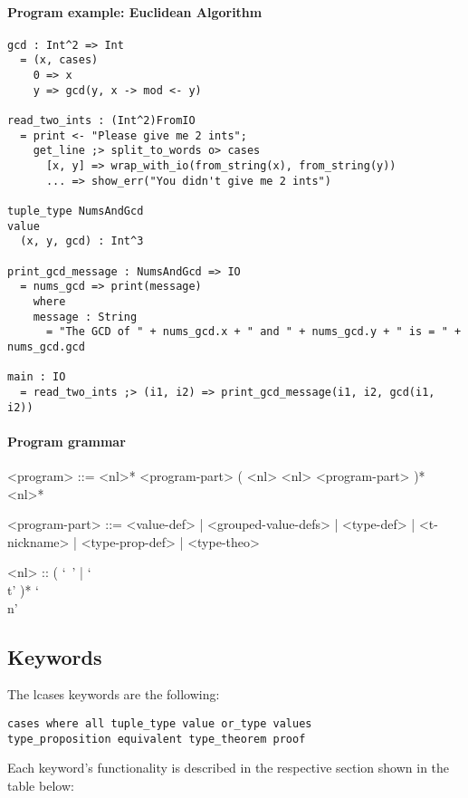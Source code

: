 \documentclass{article}
\begin{document}
\paragraph{Program example: Euclidean Algorithm}
\begin{verbatim}
gcd : Int^2 => Int
  = (x, cases)
    0 => x
    y => gcd(y, x -> mod <- y) 

read_two_ints : (Int^2)FromIO
  = print <- "Please give me 2 ints";
    get_line ;> split_to_words o> cases
      [x, y] => wrap_with_io(from_string(x), from_string(y))
      ... => show_err("You didn't give me 2 ints")

tuple_type NumsAndGcd
value
  (x, y, gcd) : Int^3

print_gcd_message : NumsAndGcd => IO
  = nums_gcd => print(message)
    where
    message : String
      = "The GCD of " + nums_gcd.x + " and " + nums_gcd.y + " is = " + nums_gcd.gcd

main : IO
  = read_two_ints ;> (i1, i2) => print_gcd_message(i1, i2, gcd(i1, i2))
\end{verbatim}

\paragraph{Program grammar}
\begin{grammar}
<program> ::=
<nl>* <program-part> ( <nl> <nl> <program-part> )* <nl>*

<program-part> ::=
<value-def> | <grouped-value-defs> | <type-def> | <t-nickname> | <type-prop-def> |
<type-theo>

<nl> :: ( `\ ' | `\\t' )* `\\n'
\end{grammar}

\subsection{Keywords}

The lcases keywords are the following:
\begin{verbatim}
cases where all tuple_type value or_type values
type_proposition equivalent type_theorem proof
\end{verbatim}
Each keyword's functionality is described in the respective section shown in the 
table below:
\end{document}
